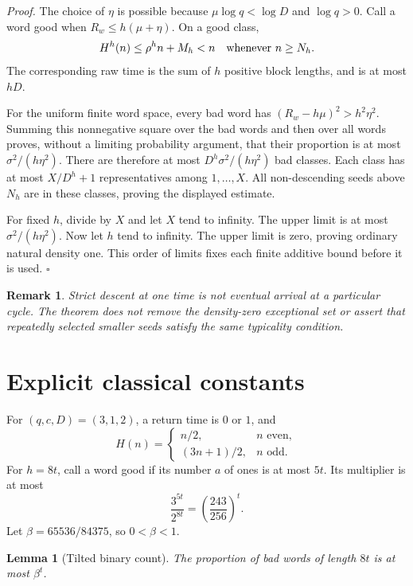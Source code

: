 \documentclass[11pt,letterpaper]{article}
\newtheorem{lemma}[theorem]{Lemma}
\newtheorem{remark}[theorem]{Remark}
\newenvironment{proof}{\noindent\textit{Proof.}}{\hfill\(\square\)}
\begin{document}
\begin{proof}
The choice of \(\eta\) is possible because
\(\mu\log q<\log D\) and \(\log q>0\).
Call a word good when \(R_w\le h(\mu+\eta)\). On a good class,
\[
H^h(n)\le \rho^h n+M_h<n
\quad\hbox{whenever }n\ge N_h.
\]
The corresponding raw time is the sum of \(h\) positive block lengths,
and is at most \(hD\).

For the uniform finite word space, every bad word has
\((R_w-h\mu)^2>h^2\eta^2\). Summing this nonnegative square over the bad
words and then over all words proves, without a limiting probability
argument, that their proportion is at most \(\sigma^2/(h\eta^2)\).
There are therefore at most
\(D^h\sigma^2/(h\eta^2)\) bad classes. Each class has at most
\(X/D^h+1\) representatives among \(1,\ldots,X\).
All non-descending seeds above \(N_h\) are in these classes, proving
the displayed estimate.

For fixed \(h\), divide by \(X\) and let \(X\) tend to infinity.
The upper limit is at most \(\sigma^2/(h\eta^2)\).
Now let \(h\) tend to infinity. The upper limit is zero, proving
ordinary natural density one. This order of limits fixes each finite
additive bound before it is used.
\end{proof}

\begin{remark}
Strict descent at one time is not eventual arrival at a particular cycle.
The theorem does not remove the density-zero exceptional set or assert
that repeatedly selected smaller seeds satisfy the same typicality
condition.
\end{remark}

\section{Explicit classical constants}

For \((q,c,D)=(3,1,2)\), a return time is \(0\) or \(1\), and
\[
H(n)=
\begin{cases}
n/2,&n\text{ even},\\
(3n+1)/2,&n\text{ odd}.
\end{cases}
\]
For \(h=8t\), call a word good if its number \(a\) of ones is at most
\(5t\). Its multiplier is at most
\[
\frac{3^{5t}}{2^{8t}}=\left(\frac{243}{256}\right)^t.
\]
Let \(\beta=65536/84375\), so \(0<\beta<1\).

\begin{lemma}[Tilted binary count]
\label{lem:binary}
The proportion of bad words of length \(8t\) is at most \(\beta^t\).
\end{lemma}
\end{document}
